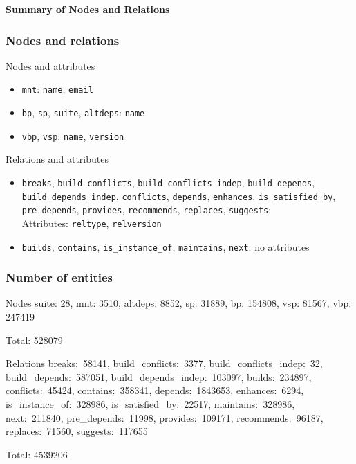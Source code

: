 \documentclass[hyperref]{beamer}
\newcommand{\cutin}[1]{%
\begin{frame}[c]\begin{center}{\Large\bf\color{myblue}#1}\end{center}\end{frame}}
\begin{document}
\cutin{Summary of Nodes and Relations}

\begin{frame}
  \frametitle{Nodes and relations}
  \begin{block}{Nodes and attributes}
    \begin{itemize}
    \item \texttt{mnt}: \texttt{name}, \texttt{email}
    \item \texttt{bp}, \texttt{sp}, \texttt{suite}, \texttt{altdeps}: \texttt{name}
    \item \texttt{vbp}, \texttt{vsp}: \texttt{name}, \texttt{version}
    \end{itemize}
  \end{block}

  \begin{block}{Relations and attributes}
    \begin{itemize}
    \item \texttt{breaks}, \texttt{build\_conflicts},
      \texttt{build\_conflicts\_indep}, \texttt{build\_depends},
      \texttt{build\_depends\_indep}, \texttt{conflicts},
      \texttt{depends}, \texttt{enhances}, \texttt{is\_satisfied\_by},
      \texttt{pre\_depends}, \texttt{provides}, \texttt{recommends}, 
      \texttt{replaces}, \texttt{suggests}:\\
      Attributes: \texttt{reltype}, \texttt{relversion}
    \item \texttt{builds}, \texttt{contains},
      \texttt{is\_instance\_of}, \texttt{maintains}, \texttt{next}: no attributes
    \end{itemize}
  \end{block}
\end{frame}

\begin{frame}
  \frametitle{Number of entities}
  \begin{block}{Nodes}
    suite: 28, mnt: 3510, altdeps: 8852, sp: 31889, bp: 154808, vsp:
    81567, vbp: 247419

    \bigskip
    Total: 528079
  \end{block}

  \begin{block}{Relations}
    breaks:~58141, build\_conflicts:~3377,
    build\_conflicts\_indep:~32, build\_depends:~587051,
    build\_depends\_indep:~103097, builds:~234897, conflicts:~45424,
    contains:~358341, depends:~1843653, enhances:~6294,
    is\_instance\_of:~328986, is\_satisfied\_by:~22517,
    maintains:~328986, next:~211840, pre\_depends:~11998,
    provides:~109171, recommends:~96187, replaces:~71560,
    suggests:~117655

    \bigskip
    Total: 4539206
  \end{block}
\end{frame}
\end{document}
